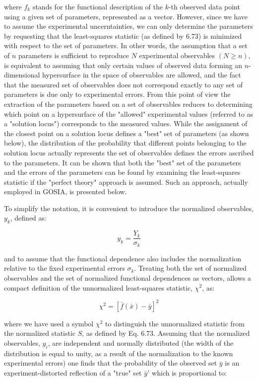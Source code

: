 \documentclass[10pt]{article}
\begin{document}
where $f_{k}$ stands for the functional description of the $k$-th observed data point using a given set of parameters, represented as a vector. However, since we have to assume the experimental uncerntainties, we can only determine the parameters by requesting that the least-squares statistic (as defined by 6.73) is minimized with respect to the set of parameters. In other words, the assumption that a set of $n$ parameters is sufficient to reproduce $N$ experimental observables $(N \geq n)$, is equivalent to assuming that only certain values of observed data forming an $n$-dimensional hypersurface in the space of observables are allowed, and the fact that the measured set of observables does not correspond exactly to any set of parameters is due only to experimental errors. From this point of view the extraction of the parameters based on a set of observables reduces to determining which point on a hypersurface of the "allowed" experimental values (referred to as a "solution locus") corresponds to the measured values. While the assignment of the closest point on a solution locus defines a "best" set of parameters (as shown below), the distribution of the probability that different points belonging to the solution locus actually represents the set of observables defines the errors ascribed to the parameters. It can be shown that both the "best" set of the parameters and the errors of the parameters can be found by examining the least-squares statistic if the "perfect theory" approach is assumed. Such an approach, actually employed in GOSIA, is presented below.

To simplify the notation, it is convenient to introduce the normalized observables, $y_{k}$, defined as:


\begin{equation*}
y_{k}=\frac{Y_{k}}{\sigma_{k}} \tag{6.111}
\end{equation*}


and to assume that the functional dependence also includes the normalization relative to the fixed experimental errors $\sigma_{k}$. Treating both the set of normalized observables and the set of normalized functional dependences as vectors, allows a compact definition of the unnormalized least-squares statistic, $\chi^{2}$, as:


\begin{equation*}
\chi^{2}=[\bar{f}(\bar{x})-\bar{y}]^{2} \tag{6.112}
\end{equation*}


where we have used a symbol $\chi^{2}$ to distinguish the unnormalized statistic from the normalized statistic $S$, as defined by Eq. 6.73. Assuming that the normalized observables, $y_{i}$, are independent and normally distributed (the width of the distribution is equal to unity, as a result of the normalization to the known experimental errors) one finds that the probability of the observed set $\bar{y}$ is an experiment-distorted reflection of a "true" set $\bar{y} \prime$ which is proportional to:
\end{document}
